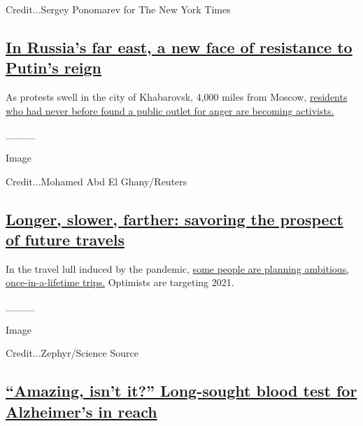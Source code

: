 Credit...Sergey Ponomarev for The New York Times

\hypertarget{in-russias-far-east-a-new-face-of-resistance-to-putins-reign}{%
\subsection{\texorpdfstring{\href{https://www.nytimes.com/2020/07/28/world/europe/russias-far-east-protests-putin.html}{In
Russia's far east, a new face of resistance to Putin's
reign}}{In Russia's far east, a new face of resistance to Putin's reign}}\label{in-russias-far-east-a-new-face-of-resistance-to-putins-reign}}

As protests swell in the city of Khabarovsk, 4,000 miles from Moscow,
\href{https://www.nytimes.com/2020/07/28/world/europe/russias-far-east-protests-putin.html}{residents
who had never before found a public outlet for anger are becoming
activists.}

\_\_\_\_

Image

Credit...Mohamed Abd El Ghany/Reuters

\hypertarget{longer-slower-farther-savoring-the-prospect-of-future-travels}{%
\subsection{\texorpdfstring{\href{https://www.nytimes.com/2020/07/28/travel/future-travel-bucket-list-coronavirus.html}{Longer,
slower, farther: savoring the prospect of future
travels}}{Longer, slower, farther: savoring the prospect of future travels}}\label{longer-slower-farther-savoring-the-prospect-of-future-travels}}

In the travel lull induced by the pandemic,
\href{https://www.nytimes.com/2020/07/28/travel/future-travel-bucket-list-coronavirus.html}{some
people are planning ambitious, once-in-a-lifetime trips.} Optimists are
targeting 2021.

\_\_\_\_

Image

Credit...Zephyr/Science Source

\hypertarget{amazing-isnt-it-long-sought-blood-test-for-alzheimers-in-reach}{%
\subsection{\texorpdfstring{\href{https://www.nytimes.com/2020/07/28/health/alzheimers-blood-test.html}{``Amazing,
isn't it?'' Long-sought blood test for Alzheimer's in
reach}}{``Amazing, isn't it?'' Long-sought blood test for Alzheimer's in reach}}\label{amazing-isnt-it-long-sought-blood-test-for-alzheimers-in-reach}}

